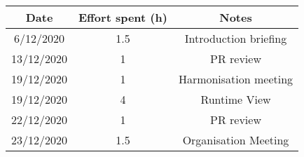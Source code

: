 \documentclass[../../main.tex]{subfiles}
\begin{document}
\begin{center}
    \begin{tabular}{|c| |c| |c|} 
        \hline
        Date & Effort spent (h) & Notes\\ [0.5ex] 
        \hline\hline
        6/12/2020 & 1.5 & Introduction briefing\\ 
        13/12/2020 & 1 & PR review\\
        19/12/2020 & 1 & Harmonisation meeting\\
        19/12/2020 & 4 & Runtime View\\
        22/12/2020 & 1 & PR review\\
        23/12/2020 & 1.5 & Organisation Meeting\\
        \hline
    \end{tabular}
\end{center}
\end{document}
